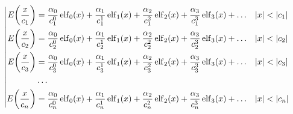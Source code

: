 \begin{equation*} \left| \begin{aligned}
E{\left(\frac{x}{c_1} \right)} &=
  \frac{\alpha_0}{c_1^0} \elf_0(x)
+ \frac{\alpha_1}{c_1^1} \elf_1(x)
+ \frac{\alpha_2}{c_1^2} \elf_2(x)
+ \frac{\alpha_3}{c_1^3} \elf_3(x)
+ \ldots &
&|x| < |c_1| \\
%
E{\left(\frac{x}{c_2} \right)} &=
  \frac{\alpha_0}{c_2^0} \elf_0(x)
+ \frac{\alpha_1}{c_2^1} \elf_1(x)
+ \frac{\alpha_2}{c_2^2} \elf_2(x)
+ \frac{\alpha_3}{c_2^3} \elf_3(x)
+ \ldots &
&|x| < |c_2| \\
%
E{\left(\frac{x}{c_3} \right)} &=
  \frac{\alpha_0}{c_3^0} \elf_0(x)
+ \frac{\alpha_1}{c_3^1} \elf_1(x)
+ \frac{\alpha_2}{c_3^2} \elf_2(x)
+ \frac{\alpha_3}{c_3^3} \elf_3(x)
+ \ldots &
&|x| < |c_3| \\
%
&\ldots \\
%
E{\left(\frac{x}{c_n} \right)} &=
  \frac{\alpha_0}{c_n^0} \elf_0(x)
+ \frac{\alpha_1}{c_n^1} \elf_1(x)
+ \frac{\alpha_2}{c_n^2} \elf_2(x)
+ \frac{\alpha_3}{c_n^3} \elf_3(x)
+ \ldots &
&|x| < |c_n| \\
\end{aligned} \right. \end{equation*}
%
